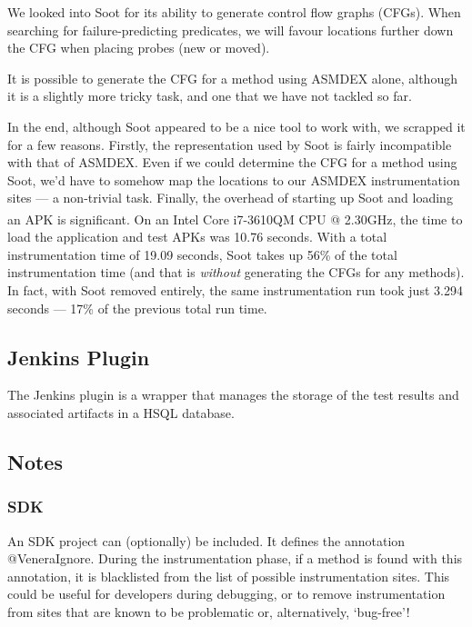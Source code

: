 We looked into Soot for its ability to generate control flow graphs (CFGs). When
searching for failure-predicting predicates, we will favour locations further
down the CFG when placing probes (new or moved).

It is possible to generate the CFG for a method using ASMDEX alone, although it
is a slightly more tricky task, and one that we have not tackled so far.

In the end, although Soot appeared to be a nice tool to work with, we scrapped
it for a few reasons. Firstly, the representation used by Soot is fairly
incompatible with that of ASMDEX. Even if we could determine the CFG for a
method using Soot, we'd have to somehow map the locations to our ASMDEX
instrumentation sites --- a non-trivial task. Finally, the overhead of starting
up Soot and loading an APK is significant. On an
Intel\textsuperscript{\textregistered} Core\textsuperscript{\texttrademark}
i7-3610QM CPU @ 2.30GHz, the time to load the application and test APKs was
10.76 seconds. With a total instrumentation time of 19.09 seconds, Soot takes up
56\% of the total instrumentation time (and that is \textit{without} generating
the CFGs for any methods). In fact, with Soot removed entirely, the same
instrumentation run took just 3.294 seconds --- 17\% of the previous total run
time.

\subsection{Jenkins Plugin}
\label{sec:sec:jenkins_plugin}

The Jenkins plugin is a wrapper that manages the storage of the test results and
associated artifacts in a HSQL database.

\subsection{Notes}

\subsubsection{SDK}
\label{sec:sec:venera_sdk}

An SDK project can (optionally) be included. It defines the annotation
@VeneraIgnore. During the instrumentation phase, if a method is found with
this annotation, it is blacklisted from the list of possible instrumentation
sites. This could be useful for developers during debugging, or to remove
instrumentation from sites that are known to be problematic or, alternatively,
{\lq}bug-free{\rq}!

